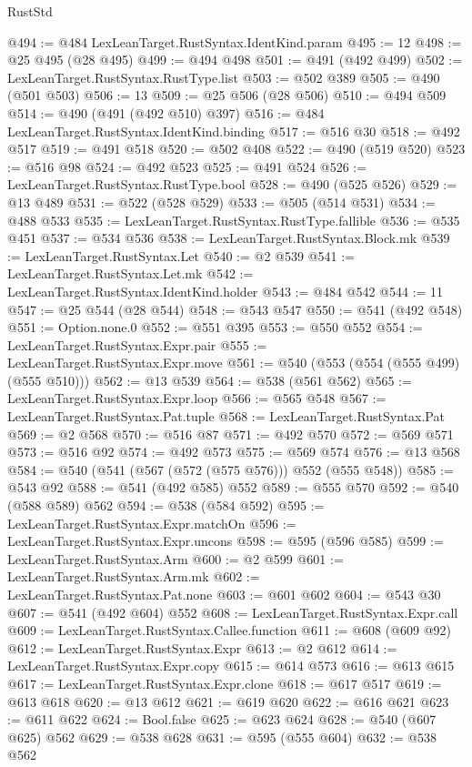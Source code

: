 \begin{lexlean}{RustStd}
\begin{coremodule}
@494 := @484 LexLeanTarget.RustSyntax.IdentKind.param
@495 := 12
@498 := @25 @495 (@28 @495)
@499 := @494 @498
@501 := @491 (@492 @499)
@502 := LexLeanTarget.RustSyntax.RustType.list
@503 := @502 @389
@505 := @490 (@501 @503)
@506 := 13
@509 := @25 @506 (@28 @506)
@510 := @494 @509
@514 := @490 (@491 (@492 @510) @397)
@516 := @484 LexLeanTarget.RustSyntax.IdentKind.binding
@517 := @516 @30
@518 := @492 @517
@519 := @491 @518
@520 := @502 @408
@522 := @490 (@519 @520)
@523 := @516 @98
@524 := @492 @523
@525 := @491 @524
@526 := LexLeanTarget.RustSyntax.RustType.bool
@528 := @490 (@525 @526)
@529 := @13 @489
@531 := @522 (@528 @529)
@533 := @505 (@514 @531)
@534 := @488 @533
@535 := LexLeanTarget.RustSyntax.RustType.fallible
@536 := @535 @451
@537 := @534 @536
@538 := LexLeanTarget.RustSyntax.Block.mk
@539 := LexLeanTarget.RustSyntax.Let
@540 := @2 @539
@541 := LexLeanTarget.RustSyntax.Let.mk
@542 := LexLeanTarget.RustSyntax.IdentKind.holder
@543 := @484 @542
@544 := 11
@547 := @25 @544 (@28 @544)
@548 := @543 @547
@550 := @541 (@492 @548)
@551 := Option.none.{0}
@552 := @551 @395
@553 := @550 @552
@554 := LexLeanTarget.RustSyntax.Expr.pair
@555 := LexLeanTarget.RustSyntax.Expr.move
@561 := @540 (@553 (@554 (@555 @499) (@555 @510)))
@562 := @13 @539
@564 := @538 (@561 @562)
@565 := LexLeanTarget.RustSyntax.Expr.loop
@566 := @565 @548
@567 := LexLeanTarget.RustSyntax.Pat.tuple
@568 := LexLeanTarget.RustSyntax.Pat
@569 := @2 @568
@570 := @516 @87
@571 := @492 @570
@572 := @569 @571
@573 := @516 @92
@574 := @492 @573
@575 := @569 @574
@576 := @13 @568
@584 := @540 (@541 (@567 (@572 (@575 @576))) @552 (@555 @548))
@585 := @543 @92
@588 := @541 (@492 @585) @552
@589 := @555 @570
@592 := @540 (@588 @589) @562
@594 := @538 (@584 @592)
@595 := LexLeanTarget.RustSyntax.Expr.matchOn
@596 := LexLeanTarget.RustSyntax.Expr.uncons
@598 := @595 (@596 @585)
@599 := LexLeanTarget.RustSyntax.Arm
@600 := @2 @599
@601 := LexLeanTarget.RustSyntax.Arm.mk
@602 := LexLeanTarget.RustSyntax.Pat.none
@603 := @601 @602
@604 := @543 @30
@607 := @541 (@492 @604) @552
@608 := LexLeanTarget.RustSyntax.Expr.call
@609 := LexLeanTarget.RustSyntax.Callee.function
@611 := @608 (@609 @92)
@612 := LexLeanTarget.RustSyntax.Expr
@613 := @2 @612
@614 := LexLeanTarget.RustSyntax.Expr.copy
@615 := @614 @573
@616 := @613 @615
@617 := LexLeanTarget.RustSyntax.Expr.clone
@618 := @617 @517
@619 := @613 @618
@620 := @13 @612
@621 := @619 @620
@622 := @616 @621
@623 := @611 @622
@624 := Bool.false
@625 := @623 @624
@628 := @540 (@607 @625) @562
@629 := @538 @628
@631 := @595 (@555 @604)
@632 := @538 @562

\end{coremodule}
\end{lexlean}
